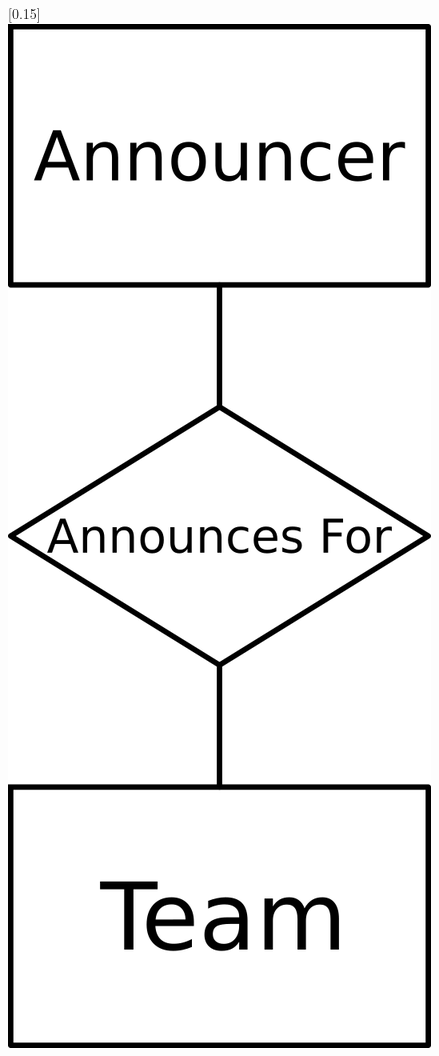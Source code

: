 \documentclass[a4paper]{article}
\begin{document}
\begin{figure}[H]
[0.15\linewidth]{\centering\includegraphics[width=0.6\linewidth]{entity6.png}}

\end{figure}
\end{document}
